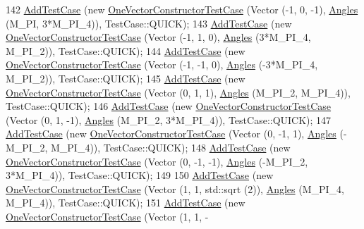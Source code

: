 \begin{DoxyCode}
142   \hyperlink{classns3_1_1TestCase_a3718088e3eefd5d6454569d2e0ddd835}{AddTestCase} (\textcolor{keyword}{new} \hyperlink{classOneVectorConstructorTestCase}{OneVectorConstructorTestCase} (Vector (-1, 0, -1),
         \hyperlink{structns3_1_1Angles}{Angles} (M\_PI, 3*M\_PI\_4)), TestCase::QUICK);
143   \hyperlink{classns3_1_1TestCase_a3718088e3eefd5d6454569d2e0ddd835}{AddTestCase} (\textcolor{keyword}{new} \hyperlink{classOneVectorConstructorTestCase}{OneVectorConstructorTestCase} (Vector (-1, 1, 0), 
         \hyperlink{structns3_1_1Angles}{Angles} (3*M\_PI\_4, M\_PI\_2)), TestCase::QUICK);
144   \hyperlink{classns3_1_1TestCase_a3718088e3eefd5d6454569d2e0ddd835}{AddTestCase} (\textcolor{keyword}{new} \hyperlink{classOneVectorConstructorTestCase}{OneVectorConstructorTestCase} (Vector (-1, -1, 0),
         \hyperlink{structns3_1_1Angles}{Angles} (-3*M\_PI\_4, M\_PI\_2)), TestCase::QUICK);
145   \hyperlink{classns3_1_1TestCase_a3718088e3eefd5d6454569d2e0ddd835}{AddTestCase} (\textcolor{keyword}{new} \hyperlink{classOneVectorConstructorTestCase}{OneVectorConstructorTestCase} (Vector (0, 1, 1),  
         \hyperlink{structns3_1_1Angles}{Angles} (M\_PI\_2, M\_PI\_4)), TestCase::QUICK);
146   \hyperlink{classns3_1_1TestCase_a3718088e3eefd5d6454569d2e0ddd835}{AddTestCase} (\textcolor{keyword}{new} \hyperlink{classOneVectorConstructorTestCase}{OneVectorConstructorTestCase} (Vector (0, 1, -1), 
         \hyperlink{structns3_1_1Angles}{Angles} (M\_PI\_2, 3*M\_PI\_4)), TestCase::QUICK);
147   \hyperlink{classns3_1_1TestCase_a3718088e3eefd5d6454569d2e0ddd835}{AddTestCase} (\textcolor{keyword}{new} \hyperlink{classOneVectorConstructorTestCase}{OneVectorConstructorTestCase} (Vector (0, -1, 1), 
         \hyperlink{structns3_1_1Angles}{Angles} (-M\_PI\_2, M\_PI\_4)), TestCase::QUICK);
148   \hyperlink{classns3_1_1TestCase_a3718088e3eefd5d6454569d2e0ddd835}{AddTestCase} (\textcolor{keyword}{new} \hyperlink{classOneVectorConstructorTestCase}{OneVectorConstructorTestCase} (Vector (0, -1, -1),
         \hyperlink{structns3_1_1Angles}{Angles} (-M\_PI\_2, 3*M\_PI\_4)), TestCase::QUICK);
149 
150   \hyperlink{classns3_1_1TestCase_a3718088e3eefd5d6454569d2e0ddd835}{AddTestCase} (\textcolor{keyword}{new} \hyperlink{classOneVectorConstructorTestCase}{OneVectorConstructorTestCase} (Vector (1, 1, 
      std::sqrt (2)),  \hyperlink{structns3_1_1Angles}{Angles} (M\_PI\_4, M\_PI\_4)), TestCase::QUICK);
151   \hyperlink{classns3_1_1TestCase_a3718088e3eefd5d6454569d2e0ddd835}{AddTestCase} (\textcolor{keyword}{new} \hyperlink{classOneVectorConstructorTestCase}{OneVectorConstructorTestCase} (Vector (1, 1, -

\end{DoxyCode}
